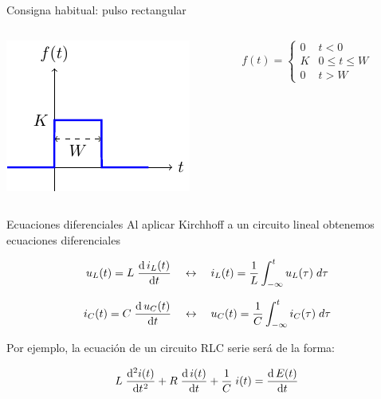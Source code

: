 \documentclass[aspectratio=169, usenames,svgnames,dvipsnames]{beamer}
\begin{document}
\begin{frame}{Consigna habitual: \hspace{3mm}pulso rectangular}
    \begin{columns}
    \begin{column}{0.6\columnwidth}
        \begin{center}
            \includegraphics[width=.7\linewidth]{../figs/pulso.pdf}
        \end{center}
    \end{column}    
    \begin{column}{0.4\columnwidth}

        \vspace{6mm}
        
        $
            f(t) = %
            \begin{cases}
            0 & t < 0\\
            K & 0 \leq t \leq W\\
            0 & t>W
            \end{cases}
        $
    \end{column}
    \end{columns}
\end{frame}


\begin{frame}{Ecuaciones diferenciales} \label{diapo:RLC_serie_intro}
    \vspace{2mm}
    Al aplicar \alert{Kirchhoff} a un circuito lineal obtenemos ecuaciones diferenciales
    
    \[
      u_L(t) = L \; \diff{\,i_L(t)}{t}
      \quad\leftrightarrow\quad
      i_L(t) = \frac{1}{L} \int^t_{-\infty}u_L(\tau) \;d\tau
    \]
    
    \[
      i_C(t) = C \; \diff{\,u_C(t)}{t}
      \quad\leftrightarrow\quad
      u_C(t) = \frac{1}{C} \int^t_{-\infty}i_C(\tau) \;d\tau
    \]

    \vspace{3mm}
    Por ejemplo, la ecuación de un \alert{circuito RLC} serie será de la forma:
    
    \[
      L \; \diff[2]{i(t)}{t} + R \; \diff{\,i(t)}{t} + \frac{1}{C} \; i(t) = \diff{\,E(t)}{t}
    \]

    \vspace{1mm}
\end{frame}
\end{document}

